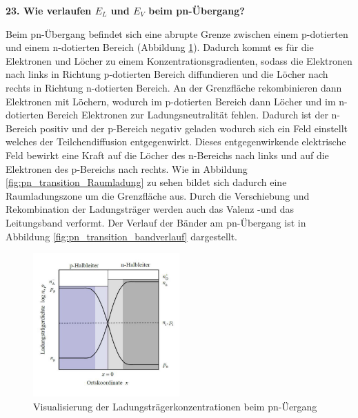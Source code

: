 \noindent\textbf{23. Wie verlaufen $E_L$ und $E_V$ beim pn-Übergang?}\\
\begin{addmargin}[25pt]{0pt}
Beim pn-Übergang befindet sich eine abrupte Grenze zwischen einem p-dotierten und einem n-dotierten Bereich (Abbildung \ref{fig:pn-transition}). Dadurch kommt es für die Elektronen und Löcher zu einem Konzentrationsgradienten, sodass die Elektronen nach links in Richtung p-dotierten Bereich diffundieren und die Löcher nach rechts in Richtung n-dotierten Bereich. An der Grenzfläche rekombinieren dann Elektronen mit Löchern, wodurch im p-dotierten Bereich dann Löcher und im n-dotierten Bereich Elektronen zur Ladungsneutralität fehlen. Dadurch ist der n-Bereich positiv und der p-Bereich negativ geladen wodurch sich ein Feld einstellt welches der Teilchendiffusion entgegenwirkt. Dieses entgegenwirkende elektrische Feld bewirkt eine Kraft auf die Löcher des n-Bereichs nach links und auf die Elektronen des p-Bereichs nach rechts. Wie in Abbildung \ref{fig:pn_transition_Raumladung} zu sehen bildet sich dadurch eine Raumladungszone um die Grenzfläche aus. Durch die Verschiebung und Rekombination der Ladungsträger werden auch das Valenz -und das Leitungsband verformt. Der Verlauf der Bänder am pn-Übergang ist in Abbildung \ref{fig:pn_transition_bandverlauf} dargestellt.\\

\begin{figure}[h]
    \centering
    \includegraphics[width = 0.5\textwidth]{images/KM2/pn_transition.jpeg}
    \caption{Visualisierung der Ladungsträgerkonzentrationen beim pn-Üergang}
    \label{fig:pn-transition}
\end{figure}




\end{addmargin}
